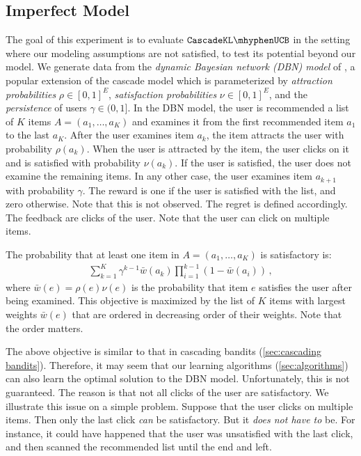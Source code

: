 \subsection{Imperfect Model}
\label{sec:experiments imperfect model}

The goal of this experiment is to evaluate $\cascadeklucb$ in the setting where our modeling assumptions are not satisfied, to test its potential beyond our model. We generate data from the \emph{dynamic Bayesian network (DBN) model} of \citet{chapelle09dynamic}, a popular extension of the cascade model which is parameterized by \emph{attraction probabilities} $\rho \in [0, 1]^E$, \emph{satisfaction probabilities} $\nu \in [0, 1]^E$, and the \emph{persistence} of users $\gamma \in (0, 1]$. In the DBN model, the user is recommended a list of $K$ items $A = (a_1, \dots, a_K)$ and examines it from the first recommended item $a_1$ to the last $a_K$. After the user examines item $a_k$, the item attracts the user with probability $\rho(a_k)$. When the user is attracted by the item, the user clicks on it and is satisfied with probability $\nu(a_k)$. If the user is satisfied, the user does not examine the remaining items. In any other case, the user examines item $a_{k + 1}$ with probability $\gamma$. The reward is one if the user is satisfied with the list, and zero otherwise. Note that this is not observed. The regret is defined accordingly. The feedback are clicks of the user. Note that the user can click on multiple items.

The probability that at least one item in $A = (a_1, \dots, a_K)$ is satisfactory is:
\begin{align*}
  \sum_{k = 1}^K \gamma^{k - 1} \bar{w}(a_k) \prod_{i = 1}^{k - 1} (1 - \bar{w}(a_i))\,,
\end{align*}
where $\bar{w}(e) = \rho(e) \nu(e)$ is the probability that item $e$ satisfies the user after being examined. This objective is maximized by the list of $K$ items with largest weights $\bar{w}(e)$ that are ordered in decreasing order of their weights. Note that the order matters.

The above objective is similar to that in cascading bandits (\cref{sec:cascading bandits}). Therefore, it may seem that our learning algorithms (\cref{sec:algorithms}) can also learn the optimal solution to the DBN model. Unfortunately, this is not guaranteed. The reason is that not all clicks of the user are satisfactory. We illustrate this issue on a simple problem. Suppose that the user clicks on multiple items. Then only the last click \emph{can} be satisfactory. But it \emph{does not have to} be. For instance, it could have happened that the user was unsatisfied with the last click, and then scanned the recommended list until the end and left.

